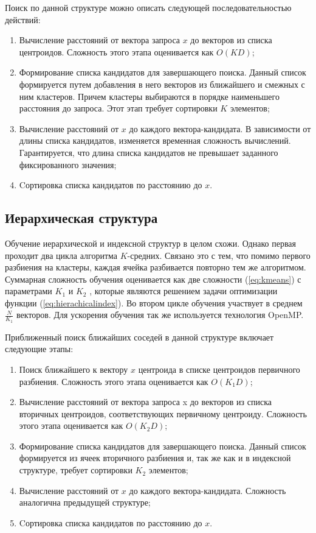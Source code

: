 Поиск по данной структуре можно описать следующей последовательностью действий:
\begin{enumerate}
\item Вычисление расстояний от вектора запроса $x$ до векторов из списка центроидов. Сложность этого этапа оценивается как $O(KD)$;
\item Формирование списка кандидатов для завершающего поиска. Данный список формируется путем добавления в него векторов из ближайшего и смежных с ним кластеров. Причем кластеры выбираются в порядке наименьшего расстояния до запроса. Этот этап требует сортировки $K$ элементов;
\item Вычисление расстояний от $x$ до каждого вектора-кандидата. В зависимости от длины списка кандидатов, изменяется временная сложность вычислений. Гарантируется, что длина списка кандидатов не превышает заданного фиксированного значения;
\item Cортировка списка кандидатов по расстоянию до $x$.
\end{enumerate}

\subsection{Иерархическая структура}

Обучение иерархической и индексной структур в целом схожи. Однако первая проходит два цикла алгоритма $K$-средних. Связано это с тем, что помимо первого разбиения на кластеры, каждая ячейка разбивается повторно тем же алгоритмом. Суммарная сложность обучения оценивается как две сложности (\ref{eq:kmeans}) с параметрами $K_1$ и $K_2$ , которые являются решением задачи оптимизации функции (\ref{eq:hierachicalindex}). Во втором цикле обучения участвует в среднем $\frac{N}{K_1}$ векторов. Для ускорения обучения так же используется технология OpenMP. 

Приближенный поиск ближайших соседей в данной структуре включает следующие этапы:
\begin{enumerate}
\item Поиск ближайшего к вектору $x$ центроида в списке центроидов первичного разбиения. Сложность этого этапа оценивается как $O(K_1D)$;
\item Вычисление расстояний от вектора запроса x до векторов из списка вторичных центроидов, соответствующих первичному центроиду. Сложность этого этапа оценивается как $O(K_2D)$;
\item Формирование списка кандидатов для завершающего поиска. Данный список формируется из ячеек вторичного разбиения и, так же как и в индексной структуре, требует сортировки $K_2$ элементов;
\item Вычисление расстояний от $x$ до каждого вектора-кандидата. Сложность аналогична предыдущей структуре;
\item Cортировка списка кандидатов по расстоянию до $x$.
\end{enumerate}

